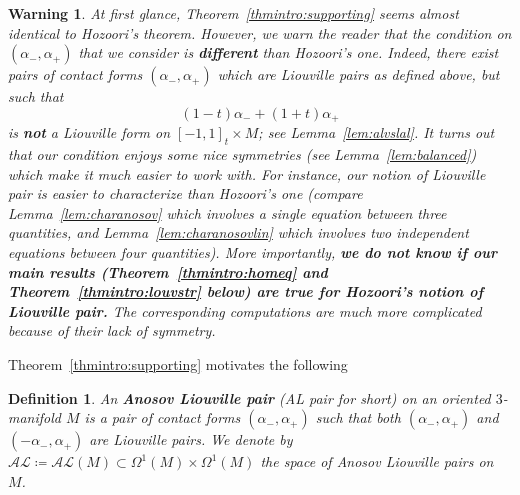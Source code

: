 \documentclass[letterpaper, 11pt]{article}
\numberwithin{equation}{section}
\newtheorem{defn}[thm]{Definition}
\newtheorem*{warn}{Warning}
\begin{document}
\begin{warn}
At first glance, Theorem~\ref{thmintro:supporting} seems almost identical to Hozoori's theorem. However, we warn the reader that the condition on $(\alpha_-, \alpha_+)$ that we consider is \textbf{different} than Hozoori's one. Indeed, there exist pairs of contact forms $(\alpha_-, \alpha_+)$ which are Liouville pairs as defined above, but such that $$(1-t) \alpha_- + (1+t) \alpha_+$$ is \textbf{not} a Liouville form on $[-1,1]_t \times M$; see Lemma~\ref{lem:alvslal}. It turns out that our condition  enjoys some nice symmetries (see Lemma~\ref{lem:balanced}) which make it much easier to work with. For instance, our notion of Liouville pair is easier to characterize than Hozoori's one (compare Lemma~\ref{lem:charanosov} which involves a single equation between three quantities, and Lemma~\ref{lem:charanosovlin} which involves two independent equations between four quantities). More importantly, \textbf{we do not know if our main results (Theorem~\ref{thmintro:homeq} and Theorem~\ref{thmintro:louvstr} below) are true for Hozoori's notion of Liouville pair.} The corresponding computations are much more complicated because of their lack of symmetry. 
\end{warn}

Theorem~\ref{thmintro:supporting} motivates the following

\begin{defn} \label{def:anoliouv}
An \textbf{Anosov Liouville pair} (AL pair for short) on an oriented $3$-manifold $M$ is a pair of contact forms $(\alpha_-, \alpha_+)$ such that both $(\alpha_-, \alpha_+)$ and $(-\alpha_-, \alpha_+)$ are Liouville pairs. We denote by $\mathcal{AL} \coloneqq \mathcal{AL}(M) \subset \Omega^1(M) \times \Omega^1(M)$ the space of Anosov Liouville pairs on $M$.
\end{defn}
\end{document}
